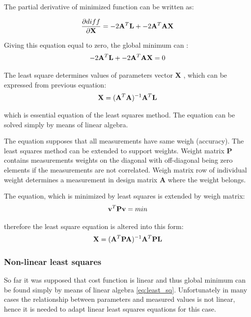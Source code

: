 \documentclass[a4paper,12pt]{article}
\newcommand{\ematr}[1]{
{\bf #1}
}
\newcommand{\evect}[1]{
{\bf #1}
}
\begin{document}
The partial derivative of minimized function can be written as:
 
\begin{equation}
\frac{\partial diff}{\partial \evect{X}} = -2\ematr{A}^{T} \evect{L} + -2\ematr{A}^{T}\ematr{A} \evect{X} 
\label{eq:least_part}
\end{equation} 

Giving this equation equal to zero, the global minimum can :
\begin{equation}
-2\ematr{A}^{T} \evect{L} + -2\ematr{A}^{T}\ematr{A} \evect{X} = 0 
\end{equation} 

The least square determines values of parameters vector \evect{X}, which can be expressed from previous equation:
\begin{equation}
\evect{X} = (\ematr{A}^{T} \ematr{A})^{-1} \ematr{A}^{T} \ematr{L}
\end{equation}

which is essential equation of the least squares method. The equation can be solved simply by means of linear algebra.

The equation supposes that all measurements have same weigh (accuracy). The least squares method can be extended to support weights.
Weight matrix \ematr{P} contains measurements weights on the diagonal with off-diagonal being zero elements if
the measurements are not correlated.
Weigh matrix row of individual weight determines a measurement in design matrix \ematr{A} where the weight belongs.

The equation, which is minimized by least squares is extended by weigh matrix:
\begin{equation}
\evect{v}^{T}  \ematr{P} \evect{v} = min
\end{equation}

therefore the least square equation is altered into this form:
\begin{equation}
\label{eq:least_sq}
\evect{X} = (\ematr{A}^{T} \ematr{P} \ematr{A})^{-1} \ematr{A}^{T} \ematr{P} \ematr{L}
\end{equation}

\subsubsection{Non-linear least squares}
\label{sec:non_least}
So far it was supposed that cost function is linear and thus global minimum can be found simply by means of linear algebra  \eqref{eq:least_sq}.
Unfortunately in many cases the relationship between parameters and 
measured values is not linear, hence it is needed to adapt linear least squares equations for this case.
\end{document}
